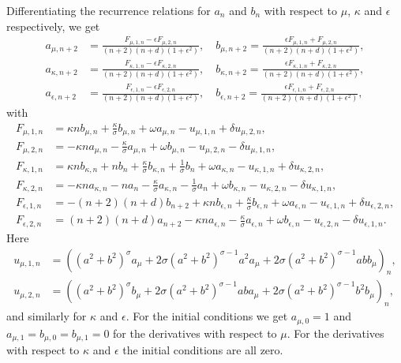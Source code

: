 \documentclass[11pt]{article}
\begin{document}
Differentiating the recurrence relations for \(a_{n}\) and \(b_{n}\)
with respect to \(\mu\), \(\kappa\) and \(\epsilon\) respectively, we get
\begin{align*}
  a_{\mu,n + 2} &= \frac{F_{\mu,1,n} - \epsilon F_{\mu,2,n}}{(n + 2)(n + d)(1 + \epsilon^{2})},\quad
  b_{\mu,n + 2} = \frac{\epsilon F_{\mu,1,n} + F_{\mu,2,n}}{(n + 2)(n + d)(1 + \epsilon^{2})},\\
  a_{\kappa,n + 2} &= \frac{F_{\kappa,1,n} - \epsilon F_{\kappa,2,n}}{(n + 2)(n + d)(1 + \epsilon^{2})},\quad
  b_{\kappa,n + 2} = \frac{\epsilon F_{\kappa,1,n} + F_{\kappa,2,n}}{(n + 2)(n + d)(1 + \epsilon^{2})},\\
  a_{\epsilon,n + 2} &= \frac{F_{\epsilon,1,n} - \epsilon F_{\epsilon,2,n}}{(n + 2)(n + d)(1 + \epsilon^{2})},\quad
  b_{\epsilon,n + 2} = \frac{\epsilon F_{\epsilon,1,n} + F_{\epsilon,2,n}}{(n + 2)(n + d)(1 + \epsilon^{2})},
\end{align*}
with
\begin{align*}
  F_{\mu,1,n} &= \kappa n b_{\mu,n} + \frac{\kappa}{\sigma}b_{\mu,n} + \omega a_{\mu,n} - u_{\mu,1,n} + \delta u_{\mu,2,n},\\
  F_{\mu,2,n} &= -\kappa n a_{\mu,n} - \frac{\kappa}{\sigma}a_{\mu,n} + \omega b_{\mu,n} - u_{\mu,2,n} - \delta u_{\mu,1,n},\\
  F_{\kappa,1,n} &= \kappa n b_{\kappa,n} + n b_{n} + \frac{\kappa}{\sigma}b_{\kappa,n} + \frac{1}{\sigma}b_{n} + \omega a_{\kappa,n} - u_{\kappa,1,n} + \delta u_{\kappa,2,n},\\
  F_{\kappa,2,n} &= -\kappa n a_{\kappa,n} - n a_{n} - \frac{\kappa}{\sigma}a_{\kappa,n} - \frac{1}{\sigma}a_{n} + \omega b_{\kappa,n} - u_{\kappa,2,n} - \delta u_{\kappa,1,n},\\
  F_{\epsilon,1,n} &= -(n + 2)(n + d)b_{n + 2} + \kappa n b_{\epsilon,n} + \frac{\kappa}{\sigma}b_{\epsilon,n} + \omega a_{\epsilon,n} - u_{\epsilon,1,n} + \delta u_{\epsilon,2,n},\\
  F_{\epsilon,2,n} &= (n + 2)(n + d)a_{n + 2} - \kappa n a_{\epsilon,n} - \frac{\kappa}{\sigma}a_{\epsilon,n} + \omega b_{\epsilon,n} - u_{\epsilon,2,n} - \delta u_{\epsilon,1,n}.
\end{align*}
Here
\begin{align*}
  u_{\mu,1,n}
  &= \left(
    (a^{2} + b^{2})^{\sigma}a_{\mu}
    + 2\sigma(a^{2} + b^{2})^{\sigma - 1}a^{2}a_{\mu}
    + 2\sigma(a^{2} + b^{2})^{\sigma - 1}abb_{\mu}
    \right)_{n},\\
  u_{\mu,2,n}
  &= \left(
    (a^{2} + b^{2})^{\sigma}b_{\mu}
    + 2\sigma(a^{2} + b^{2})^{\sigma - 1}aba_{\mu}
    + 2\sigma(a^{2} + b^{2})^{\sigma - 1}b^{2}b_{\mu}
    \right)_{n},
\end{align*}
and similarly for \(\kappa\) and \(\epsilon\). For the initial
conditions we get \(a_{\mu,0} = 1\) and
\(a_{\mu,1} = b_{\mu,0} = b_{\mu,1} = 0\) for the derivatives with
respect to \(\mu\). For the derivatives with respect to \(\kappa\) and
\(\epsilon\) the initial conditions are all zero.
\end{document}
